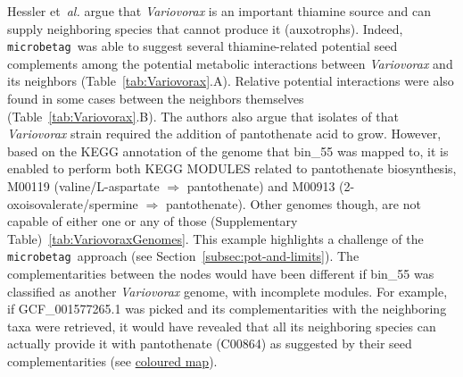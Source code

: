 \documentclass[sn-mathphys,Numbered]{sn-jnl}  %
\theoremstyle{thmstyleone}%
\theoremstyle{thmstyletwo}%
\theoremstyle{thmstylethree}%
\newcommand{\microbetag}{\texttt{microbetag }}
\begin{document}
        Hessler et~\textit{al.} argue that \textit{Variovorax} is an important thiamine source and can supply neighboring species that cannot produce it (auxotrophs). 
        Indeed, \microbetag was able to suggest several thiamine-related potential seed complements among the potential metabolic interactions between \textit{Variovorax} and its neighbors (Table~\ref{tab:Variovorax}.A). 
        Relative potential interactions were also found in some cases between the neighbors themselves (Table~\ref{tab:Variovorax}.B).
        The authors also argue that isolates of that \textit{Variovorax} strain required the addition of pantothenate acid to grow. 
        However, based on the KEGG annotation of the genome that bin\_55 was mapped to, it is enabled to perform both KEGG MODULES related to pantothenate biosynthesis,  
        M00119 (valine/L-aspartate $\Rightarrow$ pantothenate) and 
        M00913 (2-oxoisovalerate/spermine $\Rightarrow$ pantothenate).
        Other genomes though, are not capable of either one or any of those (Supplementary Table)~\ref{tab:VariovoraxGenomes}.
        This example highlights a challenge of the \microbetag approach (see Section~\ref{subsec:pot-and-limits}). 
        The complementarities between the nodes would have been different if bin\_55 was classified as another \textit{Variovorax} genome, with incomplete modules. 
        For example, if GCF\_001577265.1 was picked and its complementarities with the neighboring taxa were retrieved, it would have revealed that all its neighboring species can actually provide it with pantothenate (C00864) as suggested by their seed complementarities (see
        \href{https://www.kegg.jp/kegg-bin/show_pathway?map00770/C00049%20skyblue%2Cblue/C00099%20skyblue%2Cblue/C00141%20skyblue%2Cblue/C00966%20skyblue%2Cblue/C00010%20skyblue%2Cblue/C00882%20skyblue%2Cblue/C01134%20skyblue%2Cblue/C03492%20skyblue%2Cblue/C04352%20skyblue%2Cblue/C00099%20skyblue%2Cblue/C00141%20skyblue%2Cblue/C00966%20skyblue%2Cblue/C05665%20skyblue%2Cblue/C00010%20skyblue%2Cblue/C00141%20skyblue%2Cblue/C00882%20skyblue%2Cblue/C00966%20skyblue%2Cblue/C01134%20skyblue%2Cblue/C03492%20skyblue%2Cblue/C04352%20skyblue%2Cblue/C18911%20skyblue%2Cblue/C00864%09%23ff0000/C00864%09%23ff0000/C00864%09%23ff0000/}{coloured map}). 


\end{document}
